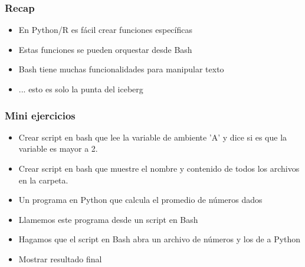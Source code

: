 \documentclass[14pt,aspectratio=169,xcolor=dvipsnames]{beamer}
\begin{document}
\begin{frame}\frametitle{Recap}
    \begin{itemize}
        \item En Python/R es fácil crear funciones específicas
        \item Estas funciones se pueden orquestar desde Bash
        \item Bash tiene muchas funcionalidades para manipular texto
        \item ... esto es solo la punta del iceberg
    \end{itemize}
\end{frame}

\begin{frame}
    \maketitle
\end{frame}
\begin{frame}[noframenumbering]\frametitle{Mini ejercicios}
    \begin{itemize}
        \item Crear script en bash que lee la variable de ambiente 'A' y dice si es que la variable es mayor a 2.
        \item Crear script en bash que muestre el nombre y contenido de todos los archivos  en la carpeta.
        \item Un programa en Python que calcula el promedio de números dados
        \item Llamemos este programa desde un script en Bash
        \item Hagamos que el script en Bash abra un archivo de números y los de a Python
        \item Mostrar resultado final
    \end{itemize}
\end{frame}
\end{document}
